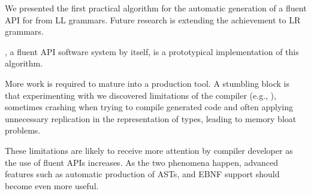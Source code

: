 We presented the first practical algorithm for the automatic generation of a
fluent API for \Java from LL grammars.  Future research is extending the
achievement to LR grammars. 

\Fajita, a fluent API software system by itself, is a prototypical
implementation of this algorithm. 

More work is required to mature \Fajita into a production tool. A stumbling
block is that experimenting with \Fajita we discovered limitations of the \Java
compiler (e.g., ), sometimes crashing when trying to compile
\Fajita generated code and often applying unnecessary replication in the
representation of types, leading to memory bloat problems.

These limitations are likely to receive more attention by compiler developer as
the use of fluent APIs increases. As the two phenomena happen, advanced
features such as automatic production of ASTs, and EBNF support should become
even more useful.
